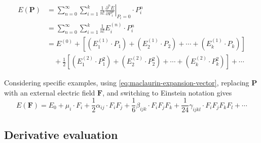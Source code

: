 \documentclass[%
class = book,%
crop = false,%
float = true,%
multi = true,%
preview = false,%
]{standalone}
\begin{document}
\begin{equation}
  \label{eq:maclaurin-expansion-vector}
  \begin{aligned}
    E(\mathbf{P}) &= \sum_{n = 0}^{\infty} \sum_{i = 1}^{k} \frac{1}{n!} \left. \frac{\partial^{n} E}{\partial P_{i}^{n}} \right|_{P_{i} = 0} \cdot P_{i}^{n} \\
    &= \sum_{n = 0}^{\infty} \sum_{i = 1}^{k} \frac{1}{n!} E_{i}^{(n)} \cdot P_{i}^{n} \\
    &= E^{(0)} + \left[ (E_{1}^{(1)} \cdot P_{1}) + (E_{2}^{(1)} \cdot P_{2}) + \cdots + (E_{k}^{(1)} \cdot P_{k}) \right] \\
    &\quad + \frac{1}{2} \left[ (E_{1}^{(2)} \cdot P_{1}^{2}) + (E_{2}^{(2)} \cdot P_{2}^{2}) + \cdots + (E_{k}^{(2)} \cdot P_{k}^{2}) \right] + \cdots
  \end{aligned}
\end{equation}

Considering specific examples, using \eqref{eq:maclaurin-expansion-vector}, replacing \(\mathbf{P}\) with an external electric field \(\mathbf{F}\), and switching to Einstein notation gives
\begin{equation}
  \label{eq:electric-field-expansion}
  E(\mathbf{F}) = E_{0} + \mu_{i} \cdot F_{i} + \frac{1}{2} \alpha_{ij} \cdot F_{i}F_{j} + \frac{1}{6} \beta_{ijk} \cdot F_{i}F_{j}F_{k} + \frac{1}{24} \gamma_{ijkl} \cdot F_{i}F_{j}F_{k}F_{l} + \cdots
\end{equation}

\subsection{Derivative evaluation}
\label{ssec:derivative-evaluation}
\end{document}

